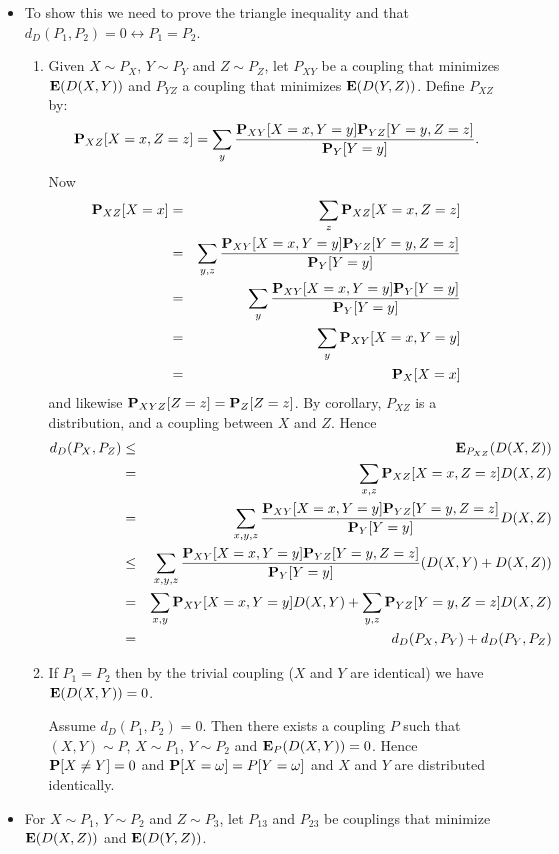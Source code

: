 \documentclass[11pt]{article} \usepackage{amssymb}
\newcommand{\E}{{\bf E}} \newcommand{\Cov}{{\bf Cov}}
\begin{document}
\begin{itemize}
\item To show this we need to prove the triangle inequality and that
  $d_D(P_1,P_2)=0 \leftrightarrow P_1=P_2$.
  \begin{enumerate}
  \item Given $X\sim P_X$, $Y\sim P_Y$ and $Z\sim P_Z$, let $P_{XY}$ be
    a coupling that minimizes $\E(D(X,Y))$ and $P_{YZ}$ a coupling that
    minimizes $\E(D(Y,Z))$. Define $P_{XZ}$ by:
    $$\P_{XZ}[X=x,Z=z]=\sum_y{\P_{XY}[X=x,Y=y]\P_{YZ}[Y=y,Z=z]\over \P_Y[Y=y]}.$$ 
    Now 
    \begin{eqnarray*}
      \P_{XZ}[X=x]&=&\sum_z\P_{XZ}[X=x,Z=z]
      \\ &=& \sum_{y,z}{\P_{XY}[X=x,Y=y]\P_{YZ}[Y=y,Z=z]\over \P_Y[Y=y]}
      \\ &=& \sum_{y}{\P_{XY}[X=x,Y=y]\P_{Y}[Y=y]\over \P_Y[Y=y]}
      \\ &=& \sum_{y}\P_{XY}[X=x,Y=y]
      \\ &=& \P_X[X=x]
    \end{eqnarray*}
    and likewise $\P_{XYZ}[Z=z]=\P_Z[Z=z]$. By corollary, $P_{XZ}$ is a
    distribution, and a coupling between $X$ and $Z$. Hence 
    \begin{eqnarray*}
      d_D(P_X,P_Z)&\leq& \E_{P_{XZ}}(D(X,Z)) 
      \\ &=& \sum_{x,z}\P_{XZ}[X=x,Z=z]D(X,Z)
      \\ &=& \sum_{x,y,z}{\P_{XY}[X=x,Y=y]\P_{YZ}[Y=y,Z=z]\over \P_Y[Y=y]}D(X,Z)
      \\ &\leq&\sum_{x,y,z}{\P_{XY}[X=x,Y=y]\P_{YZ}[Y=y,Z=z]\over \P_Y[Y=y]}(D(X,Y)+D(X,Z))
      \\ &=&\sum_{x,y}\P_{XY}[X=x,Y=y]D(X,Y)+\sum_{y,z}\P_{YZ}[Y=y,Z=z]D(X,Z)
      \\ &=&d_D(P_X,P_Y)+d_D(P_Y,P_Z)
    \end{eqnarray*}
    
  \item If $P_1=P_2$ then by the trivial coupling ($X$ and $Y$ are identical)
    we have $\E(D(X,Y))=0$. 

    Assume $d_D(P_1,P_2)=0$. Then there exists a coupling $P$ such that  
    $(X,Y)\sim P$,
    $X\sim P_1$, $Y\sim P_2$ and $\E_P(D(X,Y))=0$. Hence $\P[X\neq Y]=0$ and
    $\P[X=\omega]=P[Y=\omega]$ and $X$ and $Y$ are distributed identically.
  \end{enumerate}
  \item 
    For  $X\sim P_1$, $Y\sim P_2$ and $Z\sim P_3$, let $P_{13}$ and $P_{23}$ 
    be couplings that minimize $\E(D(X,Z))$ and
    $\E(D(Y,Z))$.
    

\end{itemize}
\end{document}
